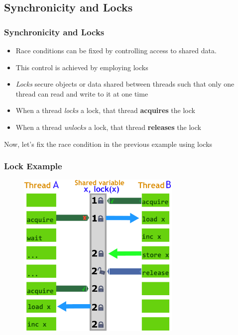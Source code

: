 \documentclass{beamer}
\newcommand{\linespace}{\vskip 0.25cm}
\begin{document}
\subsection[Locks]{Synchronicity and Locks}


\begin{frame}
\frametitle{Synchronicity and Locks}

\begin{itemize}
	\item Race conditions can be fixed by controlling access to shared data.
	\item This control is achieved by employing locks
	
	\linespace
	
	\item \emph{Locks} secure objects or data shared between threads such that only one thread can read and write to it at one time

	\linespace

	\item When a thread \emph{locks} a lock, that thread \textbf{acquires} the lock
	\item When a thread \emph{unlocks} a lock, that thread \textbf{releases} the lock
\end{itemize}

Now, let's fix the race condition in the previous example using locks

\end{frame}

\begin{frame}
\frametitle{Lock Example}
	\begin{figure}
		\includegraphics[width=0.7\textwidth]{Illustrations/Lock}
		\label{fig:lock}
	\end{figure}
\end{frame}
\end{document}
